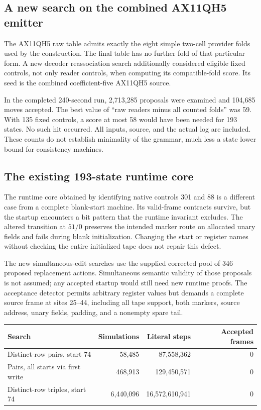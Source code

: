 \documentclass[11pt]{article}
\begin{document}
\subsection{A new search on the combined AX11QH5 emitter}

The AX11QH5 raw table admits exactly the eight simple two-cell provider
folds used by the construction. The final table has no further fold of
that particular form. A new decoder reassociation search additionally
considered eligible fixed controls, not only reader controls, when
computing its compatible-fold score. Its seed is the combined
coefficient-five AX11QH5 source.

In the completed 240-second run, 2,713,285 proposals were examined and
104,685 moves accepted. The best value of ``raw readers minus all counted
folds'' was 59. With 135 fixed controls, a score at most 58 would have been
needed for 193 states. No such hit occurred. All inputs, source, and the
actual log are included. These counts do not establish minimality of
the grammar, much less a state lower bound for consistency machines.

\subsection{The existing 193-state runtime core}

The runtime core obtained by identifying native controls 301 and 88 is
a different case from a complete blank-start machine. Its valid-frame
contracts survive, but the startup encounters a bit pattern that the
runtime invariant excludes. The altered transition at $51/0$ preserves
the intended marker route on allocated unary fields and fails during
blank initialization. Changing the start or register names without
checking the entire initialized tape does not repair this defect.

The new simultaneous-edit searches use the supplied corrected pool of
346 proposed replacement actions. Simultaneous semantic validity of
those proposals is not assumed; any accepted startup would still need
new runtime proofs. The acceptance detector permits arbitrary register
values but demands a complete source frame at sites 25--44, including
all tape support, both markers, source address, unary fields, padding,
and a nonempty spare tail.

\begin{center}\small
\begin{tabular}{@{}lrrr@{}}\toprule
Search & Simulations & Literal steps & Accepted frames\\\midrule
Distinct-row pairs, start 74 & 58,485 & 87,558,362 & 0\\
Pairs, all starts via first write & 468,913 & 129,450,571 & 0\\
Distinct-row triples, start 74 & 6,440,096 & 16,572,610,941 & 0\\\bottomrule
\end{tabular}
\end{center}
\end{document}
